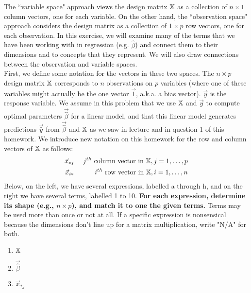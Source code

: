 \documentclass[addpoints, 12pt]{exam}
\begin{document}
\begin{questions}
\question The ``variable space" approach views the design matrix $\Bbb{X}$ as a collection of $n \times 1$ column vectors, one for each variable. On the other hand, the ``observation space" approach  considers the design matrix as a collection of
$1 \times p$ row vectors, one for each observation. 
In this exercise, we will examine many of the terms
that we have been working with in regression  (e.g. $\hat{\beta}$) and connect 
them to their dimensions and to concepts that they 
represent. We will also draw connections between the observation and 
variable spaces. 
\\

First, we define some notation for the vectors in these two spaces. The $n \times p$ design matrix $\Bbb{X}$ corresponds to 
$n$ observations on $p$ variables (where one of these variables might actually be the one vector $\vec{1}$, a.k.a. a bias vector). $\vec{y}$ is the response variable. We assume in this problem that we use $\Bbb{X}$ and $\vec{y}$ to compute optimal parameters $\vec{\hat{\beta}}$ for a linear model, and that this linear model generates predictions $\vec{\hat{y}}$ from $\vec{\hat{\beta}}$ and $\Bbb{X}$ as we saw in lecture and in question 1 of this homework. We introduce new notation on this homework for the row and column vectors of $\Bbb{X}$ as follows:
\begin{eqnarray*}
\vec{x}_{*j} &~&j^{th}\textrm{ column vector in }\Bbb{X}, j=1, \ldots, p\\
\vec{x}_{i*} &~& i^{th}\textrm{ row  vector in }\Bbb{X}, i=1, \ldots, n
\end{eqnarray*}
Below, on the left, we have several expressions, labelled a through h, and on the right we have several terms, labelled 1 to 10. \textbf{For each expression, determine its shape (e.g., $n \times p$), and match it to one the given terms.} Terms may be used more than once or not at all. If a specific expression is nonsensical because the dimensions don't line up for a matrix multiplication, write "N/A" for both.


\begin{multicols}{2}
    \begin{enumerate}[label = \alph*.]
            \item $\Bbb{X}$
        
            
      \item $\vec{\hat{\beta}}$ 
     

      \item $\vec{x}_{*j}$ 
      

\end{enumerate}
\end{multicols}
\end{questions}
\end{document}
